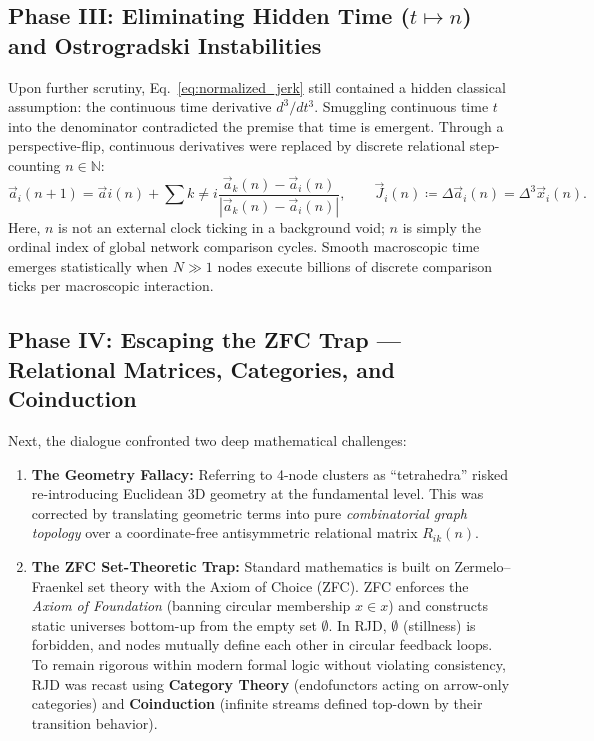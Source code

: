 \documentclass[11pt,a4paper]{article}
\theoremstyle{plain}
\theoremstyle{definition}
\theoremstyle{remark}
\begin{document}
\subsection{Phase III: Eliminating Hidden Time ($t \mapsto n$) and Ostrogradski Instabilities}
Upon further scrutiny, Eq.~\eqref{eq:normalized_jerk} still contained a hidden classical assumption: the continuous time derivative $d^3/dt^3$. Smuggling continuous time $t$ into the denominator contradicted the premise that time is emergent. Through a perspective-flip, continuous derivatives were replaced by discrete relational step-counting $n \in \mathbb{N}$:
\begin{equation}
\vec{a}_i(n+1) = \vec{a}i(n) + \sum{k \neq i} \frac{\vec{a}_k(n) - \vec{a}_i(n)}{|\vec{a}_k(n) - \vec{a}_i(n)|}, \qquad \vec{J}_i(n) \coloneqq \Delta \vec{a}_i(n) = \Delta^3 \vec{x}_i(n).
\label{eq:discrete_update}
\end{equation}
Here, $n$ is not an external clock ticking in a background void; $n$ is simply the ordinal index of global network comparison cycles. Smooth macroscopic time emerges statistically when $N \gg 1$ nodes execute billions of discrete comparison ticks per macroscopic interaction.
\subsection{Phase IV: Escaping the ZFC Trap — Relational Matrices, Categories, and Coinduction}
Next, the dialogue confronted two deep mathematical challenges:
\begin{enumerate}
\item \textbf{The Geometry Fallacy:} Referring to 4-node clusters as ``tetrahedra'' risked re-introducing Euclidean 3D geometry at the fundamental level. This was corrected by translating geometric terms into pure \textit{combinatorial graph topology} over a coordinate-free antisymmetric relational matrix $R_{ik}(n)$.
\item \textbf{The ZFC Set-Theoretic Trap:} Standard mathematics is built on Zermelo--Fraenkel set theory with the Axiom of Choice (ZFC). ZFC enforces the \textit{Axiom of Foundation} (banning circular membership $x \in x$) and constructs static universes bottom-up from the empty set $\emptyset$. In RJD, $\emptyset$ (stillness) is forbidden, and nodes mutually define each other in circular feedback loops. To remain rigorous within modern formal logic without violating consistency, RJD was recast using \textbf{Category Theory} (endofunctors acting on arrow-only categories) and \textbf{Coinduction} (infinite streams defined top-down by their transition behavior).
\end{enumerate}
\end{document}
